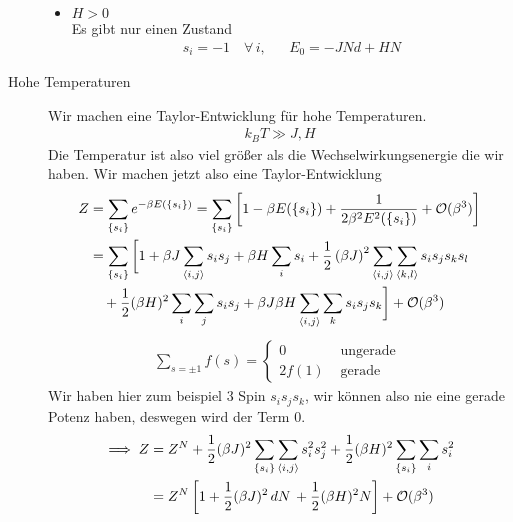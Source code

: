 \begin{description}
\begin{itemize}
      \item $H > 0$ \\
        Es gibt nur einen Zustand 
        \begin{align*}
          s_i = -1 \quad\forall\, i, && E_0 = - J N d + H N
        \end{align*}
    \end{itemize}
  \item[Hohe Temperaturen] Wir machen eine Taylor-Entwicklung für hohe Temperaturen.
    \begin{align*}
      k_B T \gg J, H
    \end{align*}
    Die Temperatur ist also viel größer als die Wechselwirkungsenergie die wir haben.
    Wir machen jetzt also eine Taylor-Entwicklung
    \begin{align*}
      Z & = \sum_{ \{s_i\} }^{} e^{-\beta E (\{s_i\})} = \sum_{\{s_i\}}^{}
      \left[ 1 - \beta E (\{s_i\}) + \frac{1}{2 \beta^2 E^2 (\{s_i\})} + \mathcal{O}(\beta^3) \right] \\
       & = \sum_{\{s_i\}}^{} \bigg[ 1+ \beta J \sum_{\Braket{i,j}}^{}
        s_i s_j + \beta H \sum_{i}^{} s_i + \frac{1}{2} \left( \beta J \right)^2
        \sum_{\Braket{i,j}}^{} \sum_{\Braket{k, l}}^{} s_i s_j s_k s_l \\ & \quad + \frac{1}{2} (\beta H )^2 \sum_{i}^{} \sum_{j}^{} s_i s_j
         + \beta J \beta H \sum_{\Braket{i,j}}^{} \sum_{k}^{} s_i s_j s_k
       \bigg] + \mathcal{O}(\beta^3)
    \end{align*}
    \begin{align*}
      \sum_{s = \pm 1}^{} f(s) = \begin{cases}
        0 & \text{ ungerade } \\
        2 f(1) & \text{ gerade}
      \end{cases} 
    \end{align*}
    Wir haben hier zum beispiel 3 Spin $s_i s_j s_k$, wir können also nie eine gerade 
    Potenz haben, deswegen wird der Term 0.
    \begin{align*}
      \implies Z & = Z^N + \frac{1}{2}(\beta J)^2 \sum_{\{s_i\}}^{} \sum_{\Braket{i,j}}^{} 
      s_i^2 s_j^2 + \frac{1}{2} (\beta H)^2 \sum_{\{s_i\}}^{} \sum_{i}^{} s_i^2  \\
      & = Z^N \left[ 1 + \frac{1}{2} (\beta J)^2 \,dN\, + \frac{1}{2} (\beta H)^2 N \right]
      + \mathcal{O}(\beta^3)
    \end{align*}
    \begin{align*}

\end{align*}
\end{description}
